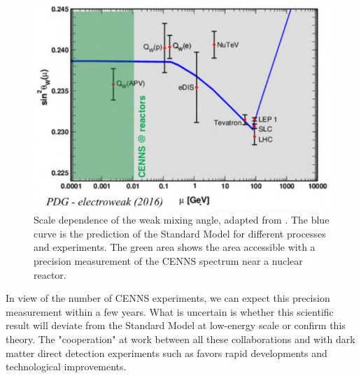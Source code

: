 \begin{figure}
\centering
\includegraphics[scale=1]{Figures/Introduction/weinberg_angle.pdf}
\caption{Scale dependence of the weak mixing angle, adapted from \cite{Patrignani:2016xqp}. The blue curve is the prediction of the Standard Model for different processes and experiments. The green area shows the area accessible with a precision measurement of the CENNS spectrum near a nuclear reactor.}
\label{fig:weinberg-angle}
\end{figure}

In view of the number of CENNS experiments, we can expect this precision measurement within a few years. What is uncertain is whether this scientific result will deviate from the Standard Model at low-energy scale or confirm this theory. The "cooperation" at work between all these collaborations and with dark matter direct detection experiments such as \Edelweiss{} favors rapid developments and technological improvements.


\subsection{\Ricochet{}}
\label{par:cryocube}

